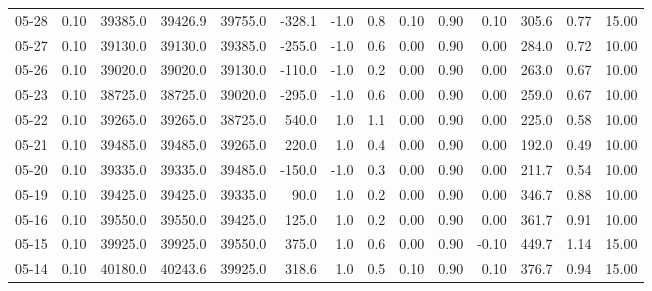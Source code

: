 \begin{threeparttable}
{\begin{tabular}{lrrrrrrrrrrrrr}
  05-28 &     0.10 & 39385.0 & 39426.9 & 39755.0 &     -328.1 &                     -1.0 &                 0.8 &       0.10 &      0.90 &           0.10 &            305.6 &            0.77 &                  15.00 \\
  05-27 &     0.10 & 39130.0 & 39130.0 & 39385.0 &     -255.0 &                     -1.0 &                 0.6 &       0.00 &      0.90 &           0.00 &            284.0 &            0.72 &                  10.00 \\
  05-26 &     0.10 & 39020.0 & 39020.0 & 39130.0 &     -110.0 &                     -1.0 &                 0.2 &       0.00 &      0.90 &           0.00 &            263.0 &            0.67 &                  10.00 \\
  05-23 &     0.10 & 38725.0 & 38725.0 & 39020.0 &     -295.0 &                     -1.0 &                 0.6 &       0.00 &      0.90 &           0.00 &            259.0 &            0.67 &                  10.00 \\
  05-22 &     0.10 & 39265.0 & 39265.0 & 38725.0 &      540.0 &                      1.0 &                 1.1 &       0.00 &      0.90 &           0.00 &            225.0 &            0.58 &                  10.00 \\
  05-21 &     0.10 & 39485.0 & 39485.0 & 39265.0 &      220.0 &                      1.0 &                 0.4 &       0.00 &      0.90 &           0.00 &            192.0 &            0.49 &                  10.00 \\
  05-20 &     0.10 & 39335.0 & 39335.0 & 39485.0 &     -150.0 &                     -1.0 &                 0.3 &       0.00 &      0.90 &           0.00 &            211.7 &            0.54 &                  10.00 \\
  05-19 &     0.10 & 39425.0 & 39425.0 & 39335.0 &       90.0 &                      1.0 &                 0.2 &       0.00 &      0.90 &           0.00 &            346.7 &            0.88 &                  10.00 \\
  05-16 &     0.10 & 39550.0 & 39550.0 & 39425.0 &      125.0 &                      1.0 &                 0.2 &       0.00 &      0.90 &           0.00 &            361.7 &            0.91 &                  10.00 \\
  05-15 &     0.10 & 39925.0 & 39925.0 & 39550.0 &      375.0 &                      1.0 &                 0.6 &       0.00 &      0.90 &          -0.10 &            449.7 &            1.14 &                  15.00 \\
  05-14 &     0.10 & 40180.0 & 40243.6 & 39925.0 &      318.6 &                      1.0 &                 0.5 &       0.10 &      0.90 &           0.10 &            376.7 &            0.94 &                  15.00 \\

\end{tabular}}
\end{threeparttable}
